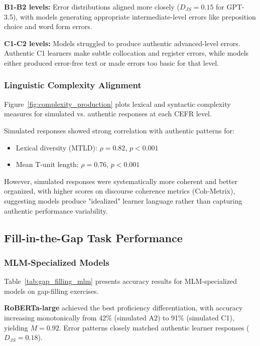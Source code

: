 \textbf{B1-B2 levels:} Error distributions aligned more closely ($D_{JS} = 0.15$ for GPT-3.5), with models generating appropriate intermediate-level errors like preposition choice and word form errors.

\textbf{C1-C2 levels:} Models struggled to produce authentic advanced-level errors. Authentic C1 learners make subtle collocation and register errors, while models either produced error-free text or made errors too basic for that level.

\subsubsection{Linguistic Complexity Alignment}

Figure~\ref{fig:complexity_production} plots lexical and syntactic complexity measures for simulated vs. authentic responses at each CEFR level.

Simulated responses showed strong correlation with authentic patterns for:
\begin{itemize}
    \item Lexical diversity (MTLD): $\rho = 0.82$, $p < 0.001$
    \item Mean T-unit length: $\rho = 0.76$, $p < 0.001$
\end{itemize}

However, simulated responses were systematically more coherent and better organized, with higher scores on discourse coherence metrics (Coh-Metrix), suggesting models produce "idealized" learner language rather than capturing authentic performance variability.

\subsection{Fill-in-the-Gap Task Performance}

\subsubsection{MLM-Specialized Models}

Table~\ref{tab:gap_filling_mlm} presents accuracy results for MLM-specialized models on gap-filling exercises.

\textbf{RoBERTa-large} achieved the best proficiency differentiation, with accuracy increasing monotonically from 42\% (simulated A2) to 91\% (simulated C1), yielding $M = 0.92$. Error patterns closely matched authentic learner responses ($D_{JS} = 0.18$).

